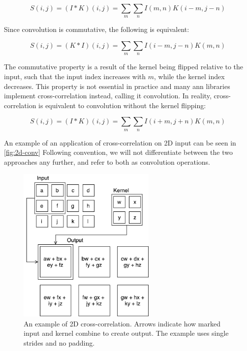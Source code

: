 \begin{equation}
S(i, j) = (I*K)(i, j) = \sum_{m} \sum_{n} I(m, n) K(i-m, j-n)
\end{equation}

\noindent Since convolution is commutative, the following is equivalent:

\begin{equation}
S(i, j) = (K*I)(i, j) = \sum_{m} \sum_{n} I(i-m, j-n) K(m, n)
\end{equation}

\noindent The commutative property is a result of the kernel being flipped relative to the input, such that the input index increases with $m$, while the kernel index decreases. This property is not essential in practice and many \acrshort{ann} libraries implement cross-correlation instead, calling it convolution. In reality, cross-correlation is equivalent to convolution without the kernel flipping:

\begin{equation}
S(i, j) = (I*K)(i, j) = \sum_{m} \sum_{n} I(i+m, j+n) K(m, n)
\end{equation}

\noindent An example of an application of cross-correlation on 2D input can be seen in \autoref{fig:2d-conv} Following convention, we will not differentiate between the two approaches any further, and refer to both as convolution operations. 

\begin{figure}[h!]
    \centering
        \includegraphics[width=0.6\textwidth]{fig/2d_conv.pdf}
        \caption[An example of 2D cross-correlation.]{An example of 2D cross-correlation. Arrows indicate how marked input and kernel combine to create output. The example uses single strides and no padding.}
        \label{fig:2d-conv}
\end{figure}
 
